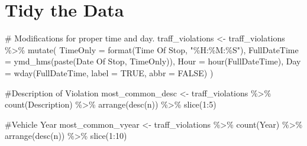 \documentclass[
  letterpaper,
  DIV=11,
  numbers=noendperiod]{scrartcl}
\newenvironment{Shaded}{\begin{snugshade}}{\end{snugshade}}
\newcommand{\AttributeTok}[1]{\textcolor[rgb]{0.40,0.45,0.13}{#1}}
\newcommand{\CommentTok}[1]{\textcolor[rgb]{0.37,0.37,0.37}{#1}}
\newcommand{\ConstantTok}[1]{\textcolor[rgb]{0.56,0.35,0.01}{#1}}
\newcommand{\DecValTok}[1]{\textcolor[rgb]{0.68,0.00,0.00}{#1}}
\newcommand{\FunctionTok}[1]{\textcolor[rgb]{0.28,0.35,0.67}{#1}}
\newcommand{\NormalTok}[1]{\textcolor[rgb]{0.00,0.23,0.31}{#1}}
\newcommand{\OtherTok}[1]{\textcolor[rgb]{0.00,0.23,0.31}{#1}}
\newcommand{\SpecialCharTok}[1]{\textcolor[rgb]{0.37,0.37,0.37}{#1}}
\newcommand{\StringTok}[1]{\textcolor[rgb]{0.13,0.47,0.30}{#1}}
\begin{document}
\section{Tidy the Data}\label{tidy-the-data}

\begin{Shaded}
\begin{Highlighting}[]
\CommentTok{\# Modifications for proper time and day.}
\NormalTok{traff\_violations }\OtherTok{\textless{}{-}}\NormalTok{ traff\_violations }\SpecialCharTok{\%\textgreater{}\%}
  \FunctionTok{mutate}\NormalTok{(}
    \AttributeTok{TimeOnly =} \FunctionTok{format}\NormalTok{(}\StringTok{\textasciigrave{}}\AttributeTok{Time Of Stop}\StringTok{\textasciigrave{}}\NormalTok{, }\StringTok{"\%H:\%M:\%S"}\NormalTok{),}
    \AttributeTok{FullDateTime =} \FunctionTok{ymd\_hms}\NormalTok{(}\FunctionTok{paste}\NormalTok{(}\StringTok{\textasciigrave{}}\AttributeTok{Date Of Stop}\StringTok{\textasciigrave{}}\NormalTok{, TimeOnly)),}
    \AttributeTok{Hour =} \FunctionTok{hour}\NormalTok{(FullDateTime),}
    \AttributeTok{Day =} \FunctionTok{wday}\NormalTok{(FullDateTime, }\AttributeTok{label =} \ConstantTok{TRUE}\NormalTok{, }\AttributeTok{abbr =} \ConstantTok{FALSE}\NormalTok{)}
\NormalTok{  )}

\CommentTok{\#Description of Violation}
\NormalTok{most\_common\_desc }\OtherTok{\textless{}{-}}\NormalTok{ traff\_violations }\SpecialCharTok{\%\textgreater{}\%}
  \FunctionTok{count}\NormalTok{(Description) }\SpecialCharTok{\%\textgreater{}\%}
  \FunctionTok{arrange}\NormalTok{(}\FunctionTok{desc}\NormalTok{(n)) }\SpecialCharTok{\%\textgreater{}\%}
  \FunctionTok{slice}\NormalTok{(}\DecValTok{1}\SpecialCharTok{:}\DecValTok{5}\NormalTok{)}

\CommentTok{\#Vehicle Year}
\NormalTok{most\_common\_vyear }\OtherTok{\textless{}{-}}\NormalTok{ traff\_violations }\SpecialCharTok{\%\textgreater{}\%}
  \FunctionTok{count}\NormalTok{(Year) }\SpecialCharTok{\%\textgreater{}\%}
  \FunctionTok{arrange}\NormalTok{(}\FunctionTok{desc}\NormalTok{(n)) }\SpecialCharTok{\%\textgreater{}\%}
  \FunctionTok{slice}\NormalTok{(}\DecValTok{1}\SpecialCharTok{:}\DecValTok{10}\NormalTok{)}


\end{Highlighting}
\end{Shaded}
\end{document}

